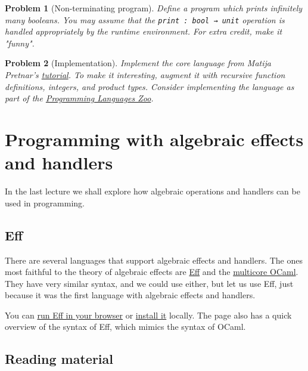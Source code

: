 \documentclass{article}
\newtheorem{problem}{Problem}[section]}
\begin{document}
\begin{problem}[Non-terminating program]
Define a program which prints infinitely many booleans. You may assume that the
\lstinline{print : bool → unit} operation is handled appropriately by the runtime
environment. For extra credit, make it "funny".
\end{problem}

\begin{problem}[Implementation]
Implement the core language from Matija Pretnar's
\href{http://www.eff-lang.org/handlers-tutorial.pdf}{tutorial}. To make it
interesting, augment it with recursive function definitions, integers, and
product types. Consider implementing the language as part of the \href{http://plzoo.andrej.com}{Programming
Languages Zoo}.
\end{problem}


\hypertarget{programming-with-algebraic-effects-and-handlers}{%
\section{Programming with algebraic effects and
handlers}\label{programming-with-algebraic-effects-and-handlers}}

In the last lecture we shall explore how algebraic operations and
handlers can be used in programming.

\hypertarget{eff}{%
\subsection{Eff}\label{eff}}

There are several languages that support algebraic effects and handlers.
The ones most faithful to the theory of algebraic effects are
\href{http://www.eff-lang.org}{Eff} and the
\href{https://github.com/ocamllabs/ocaml-multicore}{multicore OCaml}.
They have very similar syntax, and we could use either, but let us use
Eff, just because it was the first language with algebraic effects and
handlers.

You can \href{http://www.eff-lang.org/try/}{run Eff in your browser} or
\href{https://github.com/matijapretnar/eff/\#installation--usage}{install
it} locally. The page also has a quick overview of the syntax of Eff,
which mimics the syntax of OCaml.

\hypertarget{reading-material-1}{%
\subsection{Reading material}\label{reading-material-1}}
\end{document}

